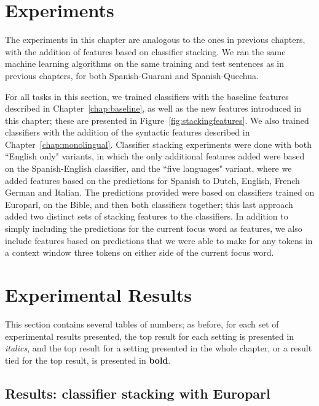 \section{Experiments}
\label{sec:multilingual-experiments}

The experiments in this chapter are analogous to the ones in previous chapters,
with the addition of features based on classifier stacking. We ran the same
machine learning algorithms on the same training and test sentences as in
previous chapters, for both Spanish-Guarani and Spanish-Quechua.

For all tasks in this section, we trained classifiers with the baseline
features described in Chapter~\ref{chap:baseline}, as well as the new features
introduced in this chapter; these are presented in
Figure~\ref{fig:stackingfeatures}.  We also trained classifiers with the
addition of the syntactic features described in Chapter~\ref{chap:monolingual}.
Classifier stacking experiments were done with both ``English only" variants,
in which the only additional features added were based on the Spanish-English
classifier, and the ``five languages" variant, where we added features based on
the predictions for Spanish to Dutch, English, French German and Italian. The
predictions provided were based on classifiers trained on Europarl, on the
Bible, and then both classifiers together; this last approach added two
distinct sets of stacking features to the classifiers.  In addition to simply
including the predictions for the current focus word as features, we also
include features based on predictions that we were able to make for any tokens
in a context window three tokens on either side of the current focus word.

\section{Experimental Results}
\label{sec:multilingual-results}

This section contains several tables of numbers; as before, for each set of
experimental results presented, the top result for each setting is presented in
\emph{italics}, and the top result for a setting presented in the whole
chapter, or a result tied for the top result, is presented in \textbf{bold}.

\subsection{Results: classifier stacking with Europarl}

